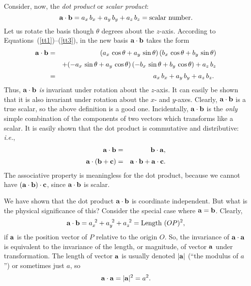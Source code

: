 Consider, now, 
the {\em dot product} or {\em scalar product}:
\begin{equation}
{\bf a} \cdot {\bf b} = a_x \,b_x + a_y \,b_y + a_z \,b_z =  {\rm scalar~number}.
\end{equation}
Let us rotate the basis though $\theta$ degrees about the $z$-axis. According to
Equations~(\ref{tt1})--(\ref{tt3}), in the new basis ${\bf a} \cdot {\bf b}$ takes the form
\begin{eqnarray}
 {\bf a} \cdot {\bf b} &= &(a_x\, \cos\theta+a_y\,\sin\theta)\,(b_x\,\cos\theta + b_y\,\sin\theta)\nonumber\\[0.5ex]
&&+(-a_x\,\sin\theta + a_y\,\cos\theta)\,(-b_x\,\sin \theta + b_y\,\cos\theta)
+a_z\, b_z\nonumber\\[0.5ex]
&= &a_x\, b_x + a_y\, b_y + a_z\, b_z.\
\end{eqnarray}
Thus, 
${\bf a} \cdot {\bf b}$ {\em is} invariant under rotation about the $z$-axis. It can easily
be shown that it is also invariant under rotation about the $x$- and $y$-axes.
Clearly, ${\bf a} \cdot {\bf b}$ is a true scalar, so the above definition is
a good one. Incidentally, ${\bf a} \cdot {\bf b}$ is the {\em only}
simple  combination of
the components of two vectors which transforms like a scalar. It is easily
shown that the dot product  is commutative  and distributive: {\em i.e.},
\begin{eqnarray}
{\bf a} \cdot {\bf b} &=& {\bf b} \cdot {\bf a},\nonumber\\[0.5ex] 
{\bf a}\cdot({\bf b}+{\bf c}) &=& {\bf a} \cdot {\bf b} + {\bf a}\cdot {\bf c}.
\end{eqnarray}
The associative property is meaningless for the dot product, because we cannot
have $({\bf a}\cdot{\bf b}) \cdot{\bf c}$, since  ${\bf a}\cdot{\bf b}$ is scalar.

We have shown that the dot product ${\bf a} \cdot {\bf b}$ is coordinate independent.
But what is the physical significance of this? Consider the special case
where ${\bf a} = {\bf b}$. Clearly,
\begin{equation}
{\bf a} \cdot {\bf b} = a_x^{~2}+a_y^{~2} + a_z^{~2} = {\rm Length}~(OP)^2,
\end{equation}
if ${\bf a}$ is the position vector of $P$ relative to the origin $O$. 
So, the invariance of ${\bf a} \cdot {\bf a}$ is equivalent to the invariance 
of the length, or magnitude, of  vector ${\bf a}$ under transformation. The length of
 vector ${\bf a}$ is usually denoted $|{\bf a}|$ (``the  modulus of $a$'') or sometimes
just $a$, so
\begin{equation}
{\bf a} \cdot {\bf a} = |{\bf a}|^2  = a^2.
\end{equation}

